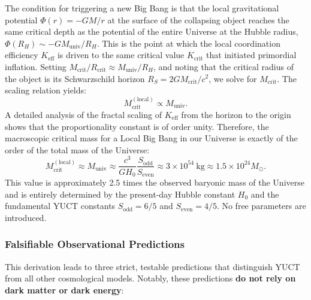 \documentclass[12pt,a4paper]{article}
\begin{document}
	The condition for triggering a new Big Bang is that the local gravitational potential \(\Phi(r) = -GM/r\) at the surface of the collapsing object reaches the same critical depth as the potential of the entire Universe at the Hubble radius, \(\Phi(R_H) \sim -G M_{\mathrm{univ}}/R_H\). This is the point at which the local coordination efficiency \(K_{\mathrm{eff}}\) is driven to the same critical value \(K_{\mathrm{crit}}\) that initiated primordial inflation. Setting \(M_{\mathrm{crit}}/R_{\mathrm{crit}} \approx M_{\mathrm{univ}}/R_H\), and noting that the critical radius of the object is its Schwarzschild horizon \(R_S = 2GM_{\mathrm{crit}}/c^2\), we solve for \(M_{\mathrm{crit}}\). The scaling relation yields:
	\begin{equation}
		M_{\mathrm{crit}}^{\mathrm{(local)}} \propto M_{\mathrm{univ}}.
	\end{equation}
	A detailed analysis of the fractal scaling of \(K_{\mathrm{eff}}\) from the horizon to the origin \cite{AppendixL} shows that the proportionality constant is of order unity. Therefore, the macroscopic critical mass for a Local Big Bang in our Universe is exactly of the order of the total mass of the Universe:
	\begin{equation}
		\boxed{ M_{\mathrm{crit}}^{\mathrm{(local)}} \approx M_{\mathrm{univ}} \approx \frac{c^3}{G H_0} \frac{S_{\mathrm{odd}}}{S_{\mathrm{even}}} \approx 3 \times 10^{54}\ \mathrm{kg} \approx 1.5 \times 10^{24} M_{\odot} }.
		\label{eq:Mcrit-macro}
	\end{equation}
	This value is approximately 2.5 times the observed baryonic mass of the Universe and is entirely determined by the present-day Hubble constant \(H_0\) and the fundamental YUCT constants \(S_{\mathrm{odd}}=6/5\) and \(S_{\mathrm{even}}=4/5\). No free parameters are introduced.
	
	\subsubsection{Falsifiable Observational Predictions}
	
	This derivation leads to three strict, testable predictions that distinguish YUCT from all other cosmological models. Notably, these predictions \textbf{do not rely on dark matter or dark energy}:
	
\end{document}
